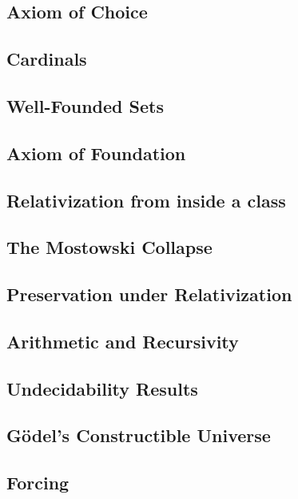 \documentclass[twocolumn]{article}
\begin{document}
\subsection*{Axiom of Choice}
\subsection*{Cardinals}
\subsection*{Well-Founded Sets}
\subsection*{Axiom of Foundation}
\subsection*{Relativization from inside a class}
\subsection*{The Mostowski Collapse}
\subsection*{Preservation under Relativization}
\subsection*{Arithmetic and Recursivity}
\subsection*{Undecidability Results}
\subsection*{G\"odel's Constructible Universe}
\subsection*{Forcing}
\end{document}
